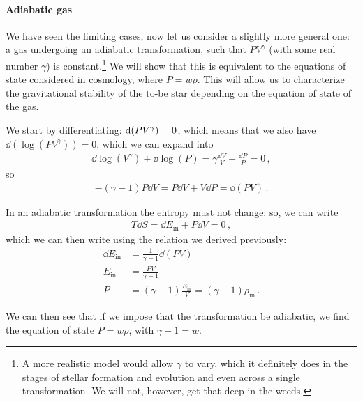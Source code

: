 \documentclass[main.tex]{subfiles}
\begin{document}

\paragraph{Adiabatic gas}

We have seen the limiting cases, now let us consider a slightly more general one: a gas undergoing an adiabatic transformation, such that \(P V^{\gamma }\) (with some real number \(\gamma \)) is constant.\footnote{A more realistic model would allow \(\gamma \) to vary, which it definitely does in the stages of stellar formation and evolution and even across a single transformation. We will not, however, get that deep in the weeds.}
We will show that this is equivalent to the equations of state considered in cosmology, where \(P = w \rho \). 
This will allow us to characterize the gravitational stability of the to-be star depending on the equation of state of the gas. 

We start by differentiating: \(\dd \qty(P V^{\gamma }) = 0\), which means that we also have \(\dd{ (\log (P V^{\gamma }))} = 0\), which we can expand into
%
\begin{align}
  \dd{\log (V^{\gamma })} + \dd{\log (P)} = 
  \gamma \frac{ \dd{V}}{V} + \frac{ \dd{P}}{P} = 0
\,,
\end{align}
%
so 
%
\begin{align}
  - (\gamma -1 ) P \dd{V}
  = P \dd{V} + V \dd{P} =
  \dd{(PV)} 
\,.
\end{align}
%

In an adiabatic transformation the entropy must not change: so, we can write
%
\begin{align}
  T \dd{S} = 
  \dd{E _{\text{in}}} + P \dd{V} = 0
\,,
\end{align}
%
which we can then write using the relation we derived previously:
%
\begin{align}
  \dd{E _{\text{in}}} &= \frac{1}{\gamma -1} \dd{(PV)} \\
  E _{\text{in}} &= \frac{PV}{\gamma -1}  \\
  P &= (\gamma - 1) \frac{E _{\text{in}}}{V} = (\gamma - 1) \rho _{\text{in}}
\,.
\end{align}
%

We can then see that if we impose that the transformation be adiabatic, we find the equation of state \(P  =w \rho \), with \(\gamma -1 = w\). 
\end{document}
